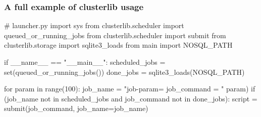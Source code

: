 \documentclass[11pt,compress,serif]{beamer}
\begin{document}
\begin{frame}[fragile=singleslide]
    \frametitle{A full example of clusterlib usage}
    
    \begin{pythoncode}
        # launcher.py
        import sys
        from clusterlib.scheduler import queued_or_running_jobs
        from clusterlib.scheduler import submit
        from clusterlib.storage import sqlite3_loads
        from main import NOSQL_PATH
        
        if __name__ == "__main__":
        scheduled_jobs = set(queued_or_running_jobs())
        done_jobs = sqlite3_loads(NOSQL_PATH)
        
        for param in range(100):
        job_name = "job-param=%
        job_command = "%
        param)
        if (job_name not in scheduled_jobs and 
        job_command not in done_jobs):
        script = submit(job_command, job_name=job_name)
    \end{pythoncode}
    
\end{frame}
\end{document}
